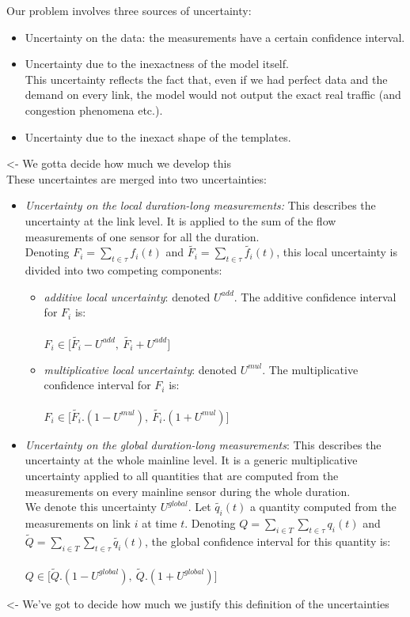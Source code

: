 Our problem involves three sources of uncertainty:
\begin{itemize}
	\item Uncertainty on the data: the measurements have a certain confidence interval.
	\item Uncertainty due to the inexactness of the model itself.\\
	This uncertainty reflects the fact that, even if we had perfect data and the demand on every link, the model would not output the exact real traffic (and congestion phenomena etc.).
	\item Uncertainty due to the inexact shape of the templates.
\end{itemize}
\color{red}<- We gotta decide how much we develop this\color{black}
\\
These uncertaintes are merged into two uncertainties:
\begin{itemize}
	\item \emph{Uncertainty on the local duration-long measurements:} This describes the uncertainty at the link level. It is applied to the sum of the flow measurements of one sensor for all the duration.\\
	Denoting $F_{i}=\sum\limits_{t\in\tau}f_{i}(t)$ and $\widetilde{F_{i}}=\sum\limits_{t\in\tau}\widetilde{f_{i}}(t)$, this local uncertainty is divided into two competing components:
	\begin{itemize}
		\item \emph{additive local uncertainty}: denoted $U^{add}$. The additive confidence interval for $F_{i}$ is:\\
		\\
		$F_{i}\in\big[\widetilde{F_{i}}-U^{add},\ \widetilde{F_{i}}+U^{add}\big]$
		\item \emph{multiplicative local uncertainty}: denoted $U^{mul}$. The multiplicative confidence interval for $F_{i}$ is:\\
		\\
		 $F_{i}\in\big[\widetilde{F_{i}}.(1-U^{mul}),\ \widetilde{F_{i}}.(1+U^{mul})\big]$
	\end{itemize}
	\item \emph{Uncertainty on the global duration-long measurements}: This describes the uncertainty at the whole mainline level. It is a generic multiplicative uncertainty applied to all quantities that are computed from the measurements on every mainline sensor during the whole duration.\\
	We denote this uncertainty $U^{global}$. Let $\widetilde{q_{i}}(t)$ a quantity computed from the measurements on link $i$ at time $t$. Denoting $Q=\sum\limits_{i\in T}\sum\limits_{t\in\tau}q_{i}(t)$ and $\widetilde{Q}=\sum\limits_{i\in T}\sum\limits_{t\in\tau}\widetilde{q_{i}}(t)$, the global confidence interval for this quantity is:\\
	\\
	$ Q\in \big[\widetilde{Q}.(1-U^{global}),\ \widetilde{Q}.(1+U^{global})\big]$
	
\end{itemize}
\color{red}<- We've got to decide how much we justify this definition of the uncertainties\color{black}